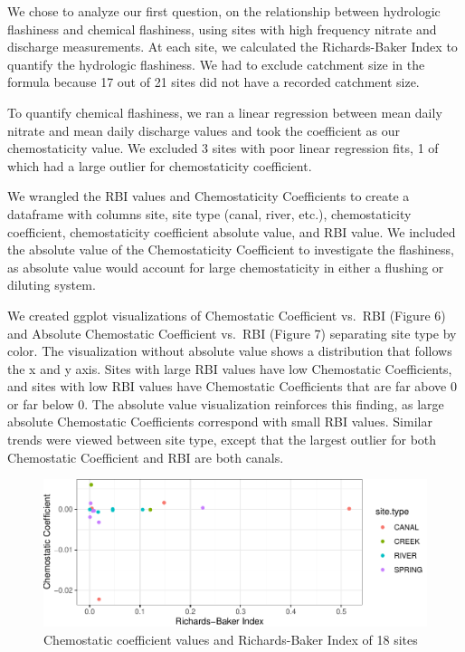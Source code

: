 \documentclass[12pt,]{article}
\begin{document}
We chose to analyze our first question, on the relationship between
hydrologic flashiness and chemical flashiness, using sites with high
frequency nitrate and discharge measurements. At each site, we
calculated the Richards-Baker Index to quantify the hydrologic
flashiness. We had to exclude catchment size in the formula because 17
out of 21 sites did not have a recorded catchment size.

To quantify chemical flashiness, we ran a linear regression between mean
daily nitrate and mean daily discharge values and took the coefficient
as our chemostaticity value. We excluded 3 sites with poor linear
regression fits, 1 of which had a large outlier for chemostaticity
coefficient.

We wrangled the RBI values and Chemostaticity Coefficients to create a
dataframe with columns site, site type (canal, river, etc.),
chemostaticity coefficient, chemostaticity coefficient absolute value,
and RBI value. We included the absolute value of the Chemostaticity
Coefficient to investigate the flashiness, as absolute value would
account for large chemostaticity in either a flushing or diluting
system.

We created ggplot visualizations of Chemostatic Coefficient vs.~RBI
(Figure 6) and Absolute Chemostatic Coefficient vs.~RBI (Figure 7)
separating site type by color. The visualization without absolute value
shows a distribution that follows the x and y axis. Sites with large RBI
values have low Chemostatic Coefficients, and sites with low RBI values
have Chemostatic Coefficients that are far above 0 or far below 0. The
absolute value visualization reinforces this finding, as large absolute
Chemostatic Coefficients correspond with small RBI values. Similar
trends were viewed between site type, except that the largest outlier
for both Chemostatic Coefficient and RBI are both canals.

\begin{figure}
\centering
\includegraphics{Final-Project-Report_files/figure-latex/unnamed-chunk-9-1.pdf}
\caption{Chemostatic coefficient values and Richards-Baker Index of 18
sites}
\end{figure}
\end{document}
